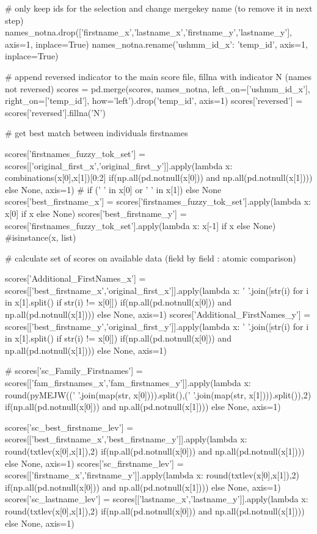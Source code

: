 \documentclass[a4paper,12pt,twoside]{book}
\begin{document}
\begin{python}
  # only keep ids for the selection and change mergekey name (to remove it in next step)
  names_notna.drop(['firstname_x','lastname_x','firstname_y','lastname_y'], axis=1, inplace=True)
  names_notna.rename({'ushmm_id_x': 'temp_id'}, axis=1, inplace=True)
  
  # append reversed indicator to the main score file, fillna with indicator N (names not reversed)
  scores = pd.merge(scores, names_notna, left_on=['ushmm_id_x'], right_on=['temp_id'], how='left').drop('temp_id', axis=1)
  scores['reversed'] = scores['reversed'].fillna('N')
   
  # get best match between individuals firstnames

  scores['firstnames_fuzzy_tok_set'] = scores[['original_first_x','original_first_y']].apply(lambda x: combinations(x[0],x[1])[0:2] if(np.all(pd.notnull(x[0])) and np.all(pd.notnull(x[1]))) else None, axis=1) # if (' ' in x[0] or ' ' in x[1]) else None
  scores['best_firstname_x'] = scores['firstnames_fuzzy_tok_set'].apply(lambda x: x[0] if x else None)
  scores['best_firstname_y'] = scores['firstnames_fuzzy_tok_set'].apply(lambda x: x[-1] if x else None) #isinstance(x, list)
  
  # calculate set of scores on available data (field by field : atomic comparison)

  scores['Additional_FirstNames_x'] = scores[['best_firstname_x','original_first_x']].apply(lambda x: ' '.join([str(i) for i in x[1].split() if str(i) != x[0]]) if(np.all(pd.notnull(x[0])) and np.all(pd.notnull(x[1]))) else None, axis=1)
  scores['Additional_FirstNames_y'] = scores[['best_firstname_y','original_first_y']].apply(lambda x: ' '.join([str(i) for i in x[1].split() if str(i) != x[0]]) if(np.all(pd.notnull(x[0])) and np.all(pd.notnull(x[1]))) else None, axis=1)

  # scores['sc_Family_Firstnames'] = scores[['fam_firstnames_x','fam_firstnames_y']].apply(lambda x: round(pyMEJW((' '.join(map(str, x[0]))).split(),(' '.join(map(str, x[1]))).split()),2) if(np.all(pd.notnull(x[0])) and np.all(pd.notnull(x[1]))) else None, axis=1)

  scores['sc_best_firstname_lev'] = scores[['best_firstname_x','best_firstname_y']].apply(lambda x: round(txtlev(x[0],x[1]),2) if(np.all(pd.notnull(x[0])) and np.all(pd.notnull(x[1]))) else None, axis=1)
  scores['sc_firstname_lev'] = scores[['firstname_x','firstname_y']].apply(lambda x: round(txtlev(x[0],x[1]),2) if(np.all(pd.notnull(x[0])) and np.all(pd.notnull(x[1]))) else None, axis=1)
  scores['sc_lastname_lev'] = scores[['lastname_x','lastname_y']].apply(lambda x: round(txtlev(x[0],x[1]),2) if(np.all(pd.notnull(x[0])) and np.all(pd.notnull(x[1]))) else None, axis=1)


\end{python}
\end{document}
